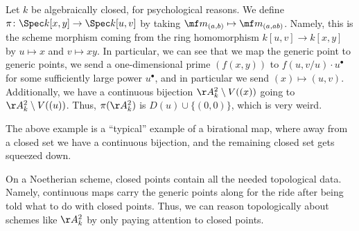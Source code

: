 \documentclass[../notes.tex]{subfiles}
\begin{document}
\begin{example}
	Let $k$ be algebraically closed, for psychological reasons. We define $\pi\colon\Spec k[x,y]\to\Spec k[u,v]$ by taking $\mf m_{(a,b)}\mapsto\mf m_{(a,ab)}$. Namely, this is the scheme morphism coming from the ring homomorphism $k[u,v]\to k[x,y]$ by $u\mapsto x$ and $v\mapsto xy$.
	In particular, we can see that we map the generic point to generic points, we send a one-dimensional prime $(f(x,y))$ to $f(u,v/u)\cdot u^\bullet$ for some sufficiently large power $u^\bullet$, and in particular we send $(x)\mapsto(u,v)$. Additionally, we have a continuous bijection $\AA^2_k\setminus V((x))$ going to $\AA^2_k\setminus V((u))$. Thus, $\pi(\AA^2_k)$ is $D(u)\cup\{(0,0)\}$, which is very weird.
\end{example}
\begin{remark}
	The above example is a ``typical'' example of a birational map, where away from a closed set we have a continuous bijection, and the remaining closed set gets squeezed down.
\end{remark}
\begin{remark}
	On a Noetherian scheme, closed points contain all the needed topological data. Namely, continuous maps carry the generic points along for the ride after being told what to do with closed points. Thus, we can reason topologically about schemes like $\AA^2_k$ by only paying attention to closed points.
\end{remark}
\end{document}
